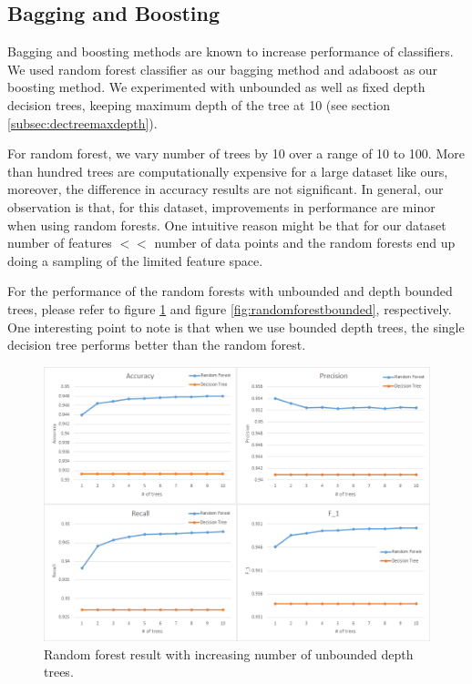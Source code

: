 \documentclass[letterpaper,12pt]{article}
\begin{document}
\subsection{Bagging and Boosting}

Bagging and boosting methods are known to increase performance of classifiers. We used random forest classifier as our bagging method and adaboost as our boosting method. We experimented with unbounded as well as fixed depth decision trees, keeping maximum depth of the tree at 10 (see section \ref{subsec:dectreemaxdepth}). 

For random forest, we vary number of trees by 10 over a range of 10 to 100. More than hundred trees are computationally expensive for a large dataset like ours, moreover, the difference in accuracy results are not significant. In general, our observation is that, for this dataset, improvements in performance are minor when using random forests. One intuitive reason might be that for our dataset number of features $<<$ number of data points and the random forests end up doing a sampling of the limited feature space.

For the performance of the random forests with unbounded and depth bounded trees, please refer to figure \ref{fig:randomforestunbounded}  and figure \ref{fig:randomforestbounded}, respectively. One interesting point to note is that when we use bounded depth trees, the single decision tree performs better than the random forest.

\begin{figure}[ht!]
\includegraphics[width=\textwidth]{RF.png}
\caption{Random forest result with increasing number of unbounded depth  trees.}\label{fig:randomforestunbounded}
\end{figure}
\end{document}
